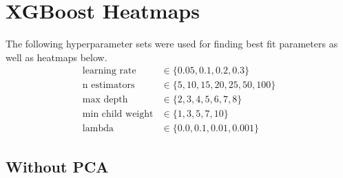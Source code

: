 \documentclass[a4paper]{article}
\begin{document}

\section{XGBoost Heatmaps} \label{app:xgboost_heatmaps}
The following hyperparameter sets were used for finding best fit parameters as well as heatmaps below.
\begin{align*}
	\text{learning rate} &\in \{0.05, 0.1, 0.2, 0.3\}\\
	\text{n estimators} &\in \{5, 10, 15, 20, 25, 50, 100\}\\
	\text{max depth} &\in \{2, 3, 4, 5, 6, 7, 8\}\\
	\text{min child weight} &\in \{1, 3, 5, 7, 10\}\\
	\text{lambda} &\in \{0.0, 0.1, 0.01, 0.001\}
\end{align*}

\subsection{Without PCA}
\end{document}
